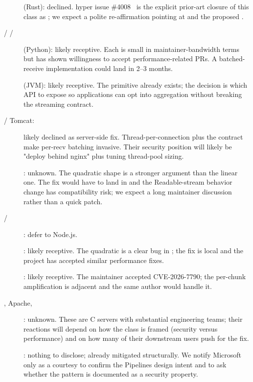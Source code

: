 \begin{description}
  \item[] (Rust): declined. hyper issue
    \#4008~\cite{hyper_4008} is the explicit prior-art closure
    of this class as ; we expect a polite
    re-affirmation pointing at
     and the proposed
    .
  \item[ /  / ] (Python):
    likely receptive. Each is small in maintainer-bandwidth terms
    but has shown willingness to accept performance-related PRs.
    A batched-receive implementation could land in 2--3 months.
  \item[] (JVM): likely receptive. The
     primitive already exists; the
    decision is which API to expose so applications can opt into
    aggregation without breaking the streaming contract.
  \item[ / Tomcat:] likely declined as
    server-side fix. Thread-per-connection plus the
     contract make per-recv batching
    invasive. Their security position will likely be "deploy
    behind nginx" plus tuning thread-pool sizing.
  \item[]: unknown. The quadratic shape is a
    stronger argument than the linear one. The fix would have to
    land in  and the
    Readable-stream behavior change has compatibility risk; we
    expect a long maintainer discussion rather than a quick patch.
  \item[ / ]: defer to Node.js.
  \item[]: likely receptive. The quadratic is a
    clear bug in
    ; the fix is local and the project
    has accepted similar performance fixes.
  \item[]: likely receptive. The
     maintainer accepted CVE-2026-7790; the
    per-chunk amplification is adjacent and the same author would
    handle it.
  \item[, Apache, ]: unknown. These are
    C servers with substantial engineering teams; their reactions
    will depend on how the class is framed (security versus
    performance) and on how many of their downstream users push
    for the fix.
  \item[]: nothing to disclose; already mitigated
    structurally. We notify Microsoft only as a courtesy to
    confirm the Pipelines design intent and to ask whether the
    pattern is documented as a security property.
\end{description}


